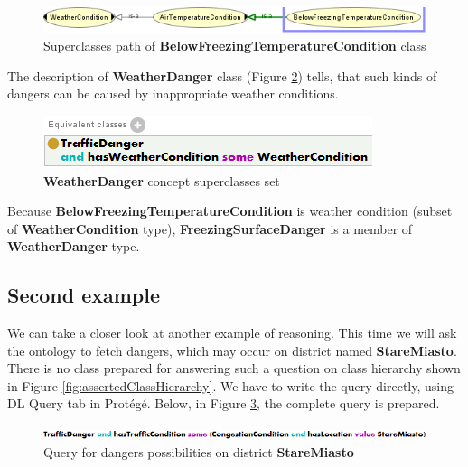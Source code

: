 \medskip

\begin{figure}[htp]
\centering
\includegraphics[scale=0.7]{images/chapter3/BelowFreezingTemperatureConditionOWLViz}
\caption{Superclasses path of \textbf{BelowFreezingTemperatureCondition} class}
\label{fig:belowFreezingTemperatureConditionOWLViz}
\end{figure}

\noindent The description of \textbf{WeatherDanger} class (Figure \ref{fig:weatherDanger}) tells, that such kinds of dangers can be caused by inappropriate weather conditions.

\medskip

\begin{figure}[htp]
\centering
\includegraphics[scale=0.7]{images/chapter3/WeatherDanger}
\caption{\textbf{WeatherDanger} concept superclasses set}
\label{fig:weatherDanger}
\end{figure}

\noindent Because \textbf{BelowFreezingTemperatureCondition} is weather condition (subset of \textbf{WeatherCondition} type), \textbf{FreezingSurfaceDanger} is a member of \textbf{WeatherDanger} type.

\subsection{Second example}
\label{sub:secondExample}

We can take a closer look at another example of reasoning. This time we will ask the ontology to fetch dangers, which may occur on district named \textbf{StareMiasto}. There is no class prepared for answering such a question on class hierarchy shown in Figure \ref{fig:assertedClassHierarchy}. We have to write the query directly, using DL Query tab in Protégé. Below, in Figure \ref{fig:query}, the complete query is prepared. 

\medskip

\begin{figure}[htp]
\centering
\includegraphics[scale=0.7]{images/chapter3/Query}
\caption{Query for dangers possibilities on district \textbf{StareMiasto}}
\label{fig:query}
\end{figure}

